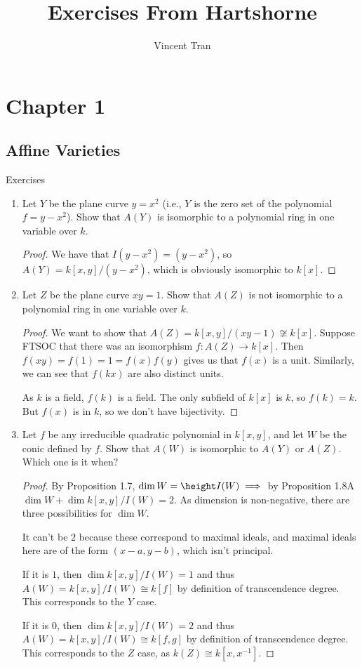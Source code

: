 \documentclass[openany, amssymb, psamsfonts]{amsart}
\title{Exercises From Hartshorne}
\author{Vincent Tran}
\begin{document}
\maketitle

\tableofcontents

\section{Chapter 1}

\subsection{Affine Varieties}

Exercises

\begin{exercise}%
\begin{enumerate}
\item Let $Y $ be the plane curve $y = x^2 $ (i.e., $Y $ is the zero set of the polynomial $f = y - x^2 $). Show that $A(Y) $ is isomorphic to a polynomial ring in one variable over $k $.
\begin{proof}
	We have that $I(y-x^2) = (y-x^2) $, so $A(Y) = k[x,y] / (y-x^2) $, which is obviously isomorphic to $k[x] $.
\end{proof}
\item Let $Z $ be the plane curve $xy = 1 $. Show that $A(Z) $ is not isomorphic to a polynomial ring in one variable over $k $.
\begin{proof}
	We want to show that $A(Z) = k[x,y] / (xy-1) \not\cong k[x] $.
	Suppose FTSOC that there was an isomorphism $f: A(Z) \to k[x]$.
	Then $f(xy) = f(1) = 1 = f(x)f(y) $ gives us that $f(x) $ is a unit.
	Similarly, we can see that $f(kx) $ are also distinct units.

	As $k $ is a field, $f(k) $ is a field.
	The only subfield of $k[x] $ is $k $, so $f(k) = k $.
	But $f(x) $ is in $k $, so we don't have bijectivity.
\end{proof}
\item Let $f $ be any irreducible quadratic polynomial in $k[x,y] $, and let $W $ be the conic defined by $f $. Show that $A(W) $ is isomorphic to $A(Y) $ or $A(Z) $. Which one is it when?
\begin{proof}
	By Proposition 1.7, $\dim W = \height I(W) \implies $ by Proposition 1.8A $\dim W + \dim k[x,y] / I(W) = 2 $.
	As dimension is non-negative, there are three possibilities for $\dim W $.

	It can't be $2 $ because these correspond to maximal ideals, and maximal ideals here are of the form $(x-a,y-b) $, which isn't principal.

	If it is $1 $, then $\dim k[x,y] / I(W) = 1 $ and thus $A(W) = k[x,y] / I(W) \cong k[f] $ by definition of transcendence degree.
	This corresponds to the $Y $ case.

	If it is $0 $, then $\dim k[x,y] / I(W) = 2 $ and thus $A(W) = k[x,y] / I(W) \cong k[f,g] $ by definition of transcendence degree.
	This corresponds to the $Z $ case, as $k(Z) \cong k[x,x^{-1}] $.
\end{proof}
\end{enumerate}
\end{exercise}
\end{document}
